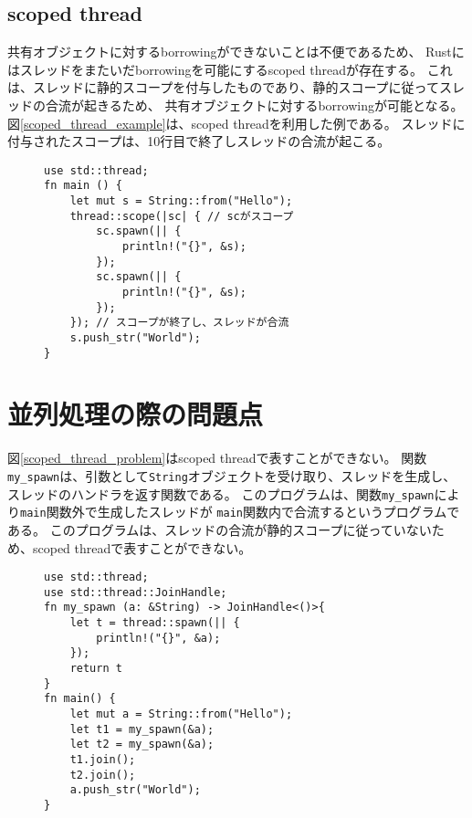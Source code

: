 \documentclass{sumiilab-paper}
\theoremstyle{mystyle}
\numberwithin{definition}{chapter} %
\begin{document}
\subsection{scoped thread}
共有オブジェクトに対するborrowingができないことは不便であるため、
Rustにはスレッドをまたいだborrowingを可能にするscoped threadが存在する。
これは、スレッドに静的スコープを付与したものであり、静的スコープに従ってスレッドの合流が起きるため、
共有オブジェクトに対するborrowingが可能となる。
図\ref{scoped_thread_example}は、scoped threadを利用した例である。
スレッドに付与されたスコープは、10行目で終了しスレッドの合流が起こる。
\begin{figure}[htp]
\begin{lstlisting}[caption=Scoped threadの例, label=scoped_thread_example, captionpos=b]
use std::thread;
fn main () {
    let mut s = String::from("Hello");
    thread::scope(|sc| { // scがスコープ
        sc.spawn(|| {
            println!("{}", &s);
        });
        sc.spawn(|| {
            println!("{}", &s);
        });
    }); // スコープが終了し、スレッドが合流
    s.push_str("World");
}
\end{lstlisting}
\end{figure}

\section{並列処理の際の問題点}
図\ref{scoped_thread_problem}はscoped threadで表すことができない。
関数\texttt{my\_spawn}は、引数として\texttt{String}オブジェクトを受け取り、スレッドを生成し、
スレッドのハンドラを返す関数である。
このプログラムは、関数\texttt{my\_spawn}により\texttt{main}関数外で生成したスレッドが
\texttt{main}関数内で合流するというプログラムである。
このプログラムは、スレッドの合流が静的スコープに従っていないため、scoped threadで表すことができない。
\begin{figure}[htp]
\begin{lstlisting}[caption=scoped threadで表せない例, 
  label=scoped_thread_problem, captionpos=b]
use std::thread;
use std::thread::JoinHandle;
fn my_spawn (a: &String) -> JoinHandle<()>{
    let t = thread::spawn(|| {
        println!("{}", &a);
    });
    return t
}
fn main() {
    let mut a = String::from("Hello");
    let t1 = my_spawn(&a);
    let t2 = my_spawn(&a);
    t1.join();
    t2.join();
    a.push_str("World");
}
\end{lstlisting}
\end{figure}
\end{document}
